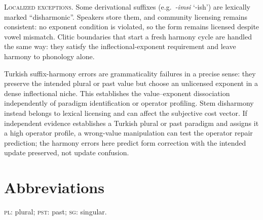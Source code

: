 \documentclass[12pt,letterpaper]{article}
\newcommand{\mention}[1]{\textit{#1}}
\newcommand{\abbr}[1]{\textsc{#1}}
\begin{document}
\noindent\textsc{Localized exceptions.} Some derivational suffixes
(e.g.~\mention{-imsi} `-ish') are lexically marked \enquote{disharmonic}.
Speakers store them, and community licensing remains consistent: no exponent
condition is violated, so the form remains licensed despite vowel mismatch.
Clitic boundaries that start a fresh harmony cycle
\autocite{KabakVogel2001} are handled the same way: they satisfy the
inflectional-exponent requirement and leave harmony to phonology alone.

Turkish suffix-harmony errors are grammaticality failures in a precise sense:
they preserve the intended plural or past value but choose an unlicensed
exponent in a dense inflectional niche. This establishes the value--exponent
dissociation independently of paradigm identification or operator profiling.
Stem disharmony instead
belongs to lexical licensing and can affect the subjective cost vector. If
independent evidence establishes a Turkish plural or past paradigm and assigns
it a high operator profile, a wrong-value manipulation can test the operator
repair prediction;
the harmony errors here predict form correction with the intended update
preserved, not update confusion.

\section*{Abbreviations}
\abbr{pl}: plural; \abbr{pst}: past; \abbr{sg}: singular.

\begin{sloppypar}
\clearpage
\printbibliography[title=References]
\end{sloppypar}
\end{document}
